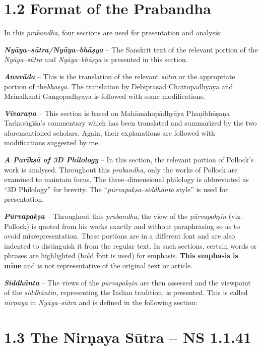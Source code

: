 \section*{1.2 Format of the Prabandha}

In this \textit{prabandha}, four sections are used for presentation and analysis:

\textit{\textbf{Nyāya–sūtra/Nyāya–bhāṣya}} – The Sanskrit text of the relevant portion of the \textit{Nyāya–sūtra }and \textit{Nyāya–bhāṣya} is presented in this section.

\textit{\textbf{Anuvāda}} – This is the translation of the relevant \textit{sūtra }or the appropriate portion of the\textit{bhāṣya}. The translation by Debiprasad Chattopadhyaya and Mrinalkanti Gangopadhyaya is followed with some modifications.

\textit{\textbf{Vivaraṇa}} – This section is based on Mahāmahopādhyāya Phaṇibhūṣaṇa Tarkavāgīśa’s commentary which has been translated and summarized by the two aforementioned scholars. Again, their explanations are followed with modifications suggested by me.

\textbf{\textit{A Parīkṣā of 3D Philology}} – In this section, the relevant portion of Pollock’s work is analysed. Throughout this \textit{prabandha}, only the works of Pollock are examined to maintain focus. The three–dimensional philology is abbreviated as “3D Philology” for brevity. The “\textit{pūrvapakṣa}–\textit{siddhānta} style” is used for presentation.

\textit{\textbf{Pūrvapakṣa}} – Throughout this \textit{prabandha}, the view of the \textit{pūrvapakṣin} (viz. Pollock) is quoted from his works exactly and without paraphrasing so as to avoid misrepresentation. These portions are in a different font and are also indented to distinguish it from the regular text. In such sections, certain words or phrases are highlighted (bold font is used) for emphasis. \textbf{This emphasis is mine} and is not representative of the original text or article.

\textit{\textbf{Siddhānta}} – The views of the \textit{pūrvapakṣin} are then assessed and the viewpoint of the \textit{siddhāntin,} representing the Indian tradition, is presented. This is called \textit{nirṇaya} in \textit{Nyāya–sūtra} and is defined in the following section:


\section*{1.3 The Nirṇaya Sūtra – NS 1.1.41}

